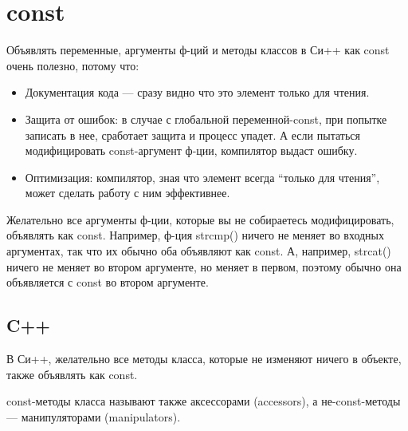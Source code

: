 ﻿\section{const}

Объявлять переменные, аргументы ф-ций и методы классов в Си++ как const очень полезно, потому что:

\begin{itemize}
\item
Документация кода --- сразу видно что это элемент только для чтения.

\item
Защита от ошибок: в случае с глобальной переменной-const, при попытке записать в нее, 
сработает защита и процесс упадет.
А если пытаться модифицировать const-аргумент ф-ции, компилятор выдаст ошибку.

\item
Оптимизация: компилятор, зная что элемент всегда ``только для чтения'', может сделать работу с ним эффективнее.
\end{itemize}

Желательно все аргументы ф-ции, которые вы не собираетесь модифицировать, объявлять как const.
Например, ф-ция strcmp() ничего не меняет во входных аргументах, так что их обычно оба объявляют как const.
А, например, strcat() ничего не меняет во втором аргументе, но меняет в первом, поэтому обычно она объявляется
с const во втором аргументе.

\subsection{C++}

В Си++, желательно все методы класса, которые не изменяют ничего в объекте, 
также объявлять как const.

const-методы класса называют также аксессорами (accessors), 
а не-const-методы --- манипуляторами (manipulators)\cite{Lakos}.
